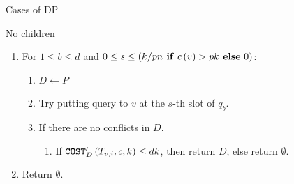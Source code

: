 \begin{frame}{Cases of DP}

\end{frame}
\begin{frame}{No children}
    \begin{enumerate}
        \item For $1\leq b\leq d$ and $0\leq s\leq \left( k/pn \text{\textbf{ if} }c\left( v \right)>pk \text{\textbf{ else} 0} \right)$:
        \begin{enumerate}
            \item $D\gets P$
            \item Try putting query to $v$ at the $s$-th slot of $q_b$.
            \item If there are no conflicts in $D$.
            \begin{enumerate}
                \item If $\texttt{COST}'_{D}\left( T_{v,i},c,k \right)\leq dk$, then return $D$, else return $\emptyset$.
            \end{enumerate}
        \end{enumerate}
        \item Return $\emptyset$.
    \end{enumerate}
\end{frame}
